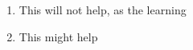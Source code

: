 \begin{answer}
    \begin{enumerate}
        \item This will not help, as the learning 
        \item This might help
    \end{enumerate}
  
\end{answer}
